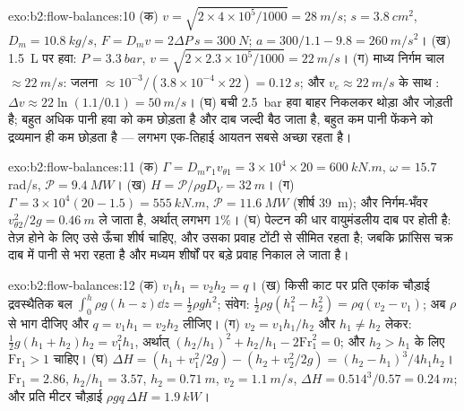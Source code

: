 \begin{solution}{exo:b2:flow-balances:10}
(क) $v = \sqrt{2 \times 4 \times 10^5/1000} = \qty{28}{m/s}$; $s = \qty{3.8}{cm^2}$, $D_m =
\qty{10.8}{kg/s}$, $F = D_mv = 2\Delta P\,s = \qty{300}{N}$; $a = 300/1.1 - 9.8 =
\qty{260}{m/s^2}$। (ख) \qty{1.5}{L} पर हवा: $P = \qty{3.3}{bar}$, $v = \sqrt{2 \times 2.3 \times
10^5/1000} = \qty{22}{m/s}$। (ग) माध्य निर्गम चाल $\approx \qty{22}{m/s}$: जलना $\approx 10^{-3}
/(3.8 \times 10^{-4} \times 22) = \qty{0.12}{s}$; और $v_e \approx \qty{22}{m/s}$ के साथ :
$\Delta v \approx 22\ln(1.1/0.1) = \qty{50}{m/s}$। (घ) बची \qty{2.5}{bar} हवा
बाहर निकलकर थोड़ा और जोड़ती है; बहुत अधिक पानी हवा को कम छोड़ता है और
दाब जल्दी बैठ जाता है, बहुत कम पानी फेंकने को द्रव्यमान ही कम छोड़ता है ---
लगभग एक-तिहाई आयतन सबसे अच्छा रहता है।
\end{solution}

\begin{solution}{exo:b2:flow-balances:11}
(क) $\Gamma = D_mr_1v_{\theta1} = 3 \times 10^4 \times 20 = \qty{600}{kN.m}$, $\omega = 15.7$ rad/s,
$\mathcal P = \qty{9.4}{MW}$। (ख) $H = \mathcal P/\rho gD_V = \qty{32}{m}$। (ग) $\Gamma = 3 \times
10^4(20 - 1.5) = \qty{555}{kN.m}$, $\mathcal P = \qty{11.6}{MW}$ (शीर्ष \qty{39}{m}); और
निर्गम-भँवर $v_{\theta2}^2/2g = \qty{0.46}{m}$ ले जाता है, अर्थात् लगभग $1\%$। (घ) पेल्टन की धार
वायुमंडलीय दाब पर होती है: तेज़ होने के लिए उसे ऊँचा शीर्ष चाहिए, और उसका
प्रवाह टोंटी से सीमित रहता है; जबकि फ़्रांसिस चक्र दाब में पानी से भरा
रहता है और मध्यम शीर्षों पर बड़े प्रवाह निकाल ले जाता है।
\end{solution}

\begin{solution}{exo:b2:flow-balances:12}
(क) $v_1h_1 = v_2h_2 = q$। (ख) किसी काट पर प्रति एकांक चौड़ाई
द्रवस्थैतिक बल $\int_0^h\rho g(h - z)\dd z = \tfrac12\rho gh^2$; संवेग: $\tfrac12\rho g(h_1^2
- h_2^2) = \rho q(v_2 - v_1)$; अब $\rho$ से भाग दीजिए और $q = v_1h_1 = v_2h_2$ लीजिए।
(ग) $v_2 = v_1h_1/h_2$ और $h_1 \ne h_2$ लेकर: $\tfrac12g(h_1 + h_2)h_2 = v_1^2h_1$,
अर्थात् $(h_2/h_1)^2 + h_2/h_1 - 2\mathrm{Fr}_1^2 = 0$; और $h_2 > h_1$ के लिए $\mathrm{Fr}_1 > 1$ चाहिए।
(घ) $\Delta H = (h_1 + v_1^2/2g) - (h_2 + v_2^2/2g) = (h_2 - h_1)^3/4h_1h_2$।
$\mathrm{Fr}_1 = 2.86$, $h_2/h_1 = 3.57$, $h_2 = \qty{0.71}{m}$, $v_2 = \qty{1.1}{m/s}$,
$\Delta H = 0.514^3/0.57 = \qty{0.24}{m}$; और प्रति मीटर चौड़ाई $\rho gq\,\Delta H = \qty{1.9}{kW}$।
\end{solution}

